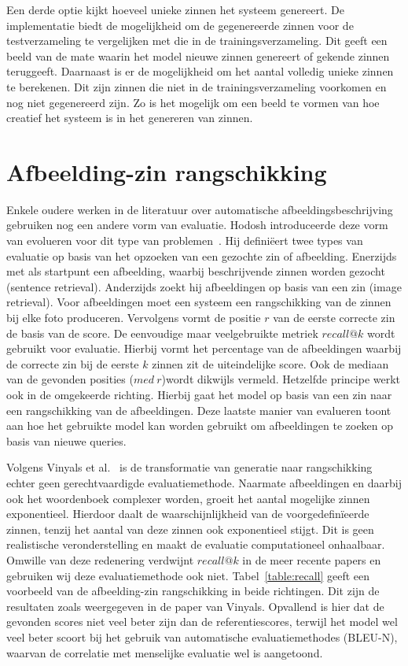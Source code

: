 Een derde optie kijkt hoeveel unieke zinnen het systeem genereert. De implementatie biedt de mogelijkheid om de gegenereerde zinnen voor de testverzameling te vergelijken met die in de trainingsverzameling. Dit geeft een beeld van de mate waarin het model nieuwe zinnen genereert of gekende zinnen teruggeeft. Daarnaast is er de mogelijkheid om het aantal volledig unieke zinnen te berekenen. Dit zijn zinnen die niet in de trainingsverzameling voorkomen en nog niet gegenereerd zijn. Zo is het mogelijk om een beeld te vormen van hoe creatief het systeem is in het genereren van zinnen. 

\section{Afbeelding-zin rangschikking}
Enkele oudere werken in de literatuur over automatische afbeeldingsbeschrijving gebruiken nog een andere vorm van evaluatie. Hodosh introduceerde deze vorm van evolueren voor dit type van problemen~\cite{Hodosh2013}. Hij defini\"eert twee types van evaluatie op basis van het opzoeken van een gezochte zin of afbeelding. Enerzijds met als startpunt een afbeelding, waarbij beschrijvende zinnen worden gezocht (sentence retrieval). Anderzijds zoekt hij afbeeldingen op basis van een zin (image retrieval). Voor afbeeldingen moet een systeem een rangschikking van de zinnen bij elke foto produceren. Vervolgens vormt de positie $r$ van de eerste correcte zin de basis van de score. De eenvoudige maar veelgebruikte metriek $recall @ k$ wordt gebruikt voor evaluatie. Hierbij vormt het percentage van de afbeeldingen waarbij de correcte zin bij de eerste $k$ zinnen zit de uiteindelijke score. Ook de mediaan van de gevonden posities ($med~r$)wordt dikwijls vermeld. Hetzelfde principe werkt ook in de omgekeerde richting. Hierbij gaat het model op basis van een zin naar een rangschikking van de afbeeldingen. Deze laatste manier van evalueren toont aan hoe het gebruikte model kan worden gebruikt om afbeeldingen te zoeken op basis van nieuwe queries. 

Volgens Vinyals et al.~\cite{Google} is de transformatie van generatie naar rangschikking echter geen gerechtvaardigde evaluatiemethode. Naarmate afbeeldingen en daarbij ook het woordenboek complexer worden, groeit het aantal mogelijke zinnen exponentieel. Hierdoor daalt de waarschijnlijkheid van de voorgedefin\"ieerde zinnen, tenzij het aantal van deze zinnen ook exponentieel stijgt. Dit is geen realistische veronderstelling en maakt de evaluatie computationeel onhaalbaar. Omwille van deze redenering verdwijnt $recall @ k$ in de meer recente papers en gebruiken wij deze evaluatiemethode ook niet. Tabel~\ref{table:recall} geeft een voorbeeld van de afbeelding-zin rangschikking in beide richtingen. Dit zijn de resultaten zoals weergegeven in de paper van Vinyals. Opvallend is hier dat de gevonden scores niet veel beter zijn dan de referentiescores, terwijl het model wel veel beter scoort bij het gebruik van automatische evaluatiemethodes (BLEU-N), waarvan de correlatie met menselijke evaluatie wel is aangetoond.


